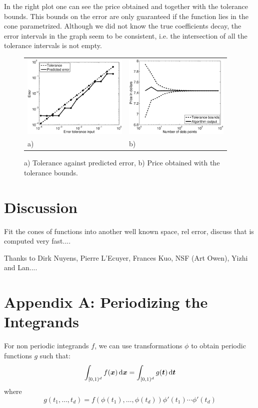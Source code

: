 \documentclass[graybox,footinfo]{svmult}
\newcommand{\bst}{\boldsymbol{t}}    %
\newcommand{\bsx}{\boldsymbol{x}}    %
\begin{document}
In the right plot one can see the price obtained and together with the tolerance bounds. This bounds on the error are only guaranteed if the function lies in the cone parametrized. Although we did not know the true coefficients decay, the error intervals in the graph seem to be consistent, i.e. the intersection of all the tolerance intervals is not empty.
\begin{figure}[h!]
\centering
\begin{tabular}{>{\centering}p{5cm}>{\centering}p{5cm}}
\includegraphics[width=5cm]{Images/Multicall_conv.eps} &
\includegraphics[width=5cm]{Images/Multicall_error.eps}\tabularnewline
a) & b)
\end{tabular}
\caption{a) Tolerance against predicted error, b) Price obtained with the tolerance bounds. \label{BasketOption}}
\end{figure}


\section{Discussion}
Fit the cones of functions into another well known space, rel error, discuss that is computed very fast....


\begin{acknowledgement}
Thanks to Dirk Nuyens, Pierre L'Ecuyer, Frances Kuo, NSF (Art Owen), Yizhi and Lan....
\end{acknowledgement}




\section*{Appendix A: Periodizing the Integrands}\label{periodizing}
For non periodic integrands $f$, we can use transformations $\phi$ to obtain periodic functions $g$ such that:
\begin{equation}\label{transeq}
\int_{\cube} f(\bsx)  \, \dif \bsx=\int_{\cube} g(\bst)  \, \dif \bst
\end{equation}
where
\begin{equation}\label{gdef}
g(t_1,\dots,t_d)=f(\phi(t_1),\dots,\phi(t_d))\phi'(t_1)\cdots\phi'(t_d)
\end{equation}
\end{document}
